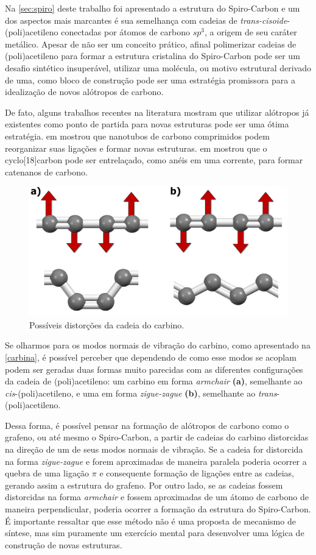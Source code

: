 	Na \autoref{sec:spiro} deste trabalho foi apresentado a estrutura do Spiro-Carbon e um dos aspectos mais marcantes é sua semelhança com cadeias de \textit{trans-cisoide}-(poli)acetileno conectadas por átomos de carbono $sp^3$, a origem de seu caráter metálico. Apesar de não ser um conceito prático, afinal polimerizar cadeias de (poli)acetileno para formar a estrutura cristalina do Spiro-Carbon pode ser um desafio sintético insuperável, utilizar uma molécula, ou motivo estrutural derivado de uma, como bloco de construção pode ser uma estratégia promissora para a idealização de novos alótropos de carbono.
	
	De fato, alguns trabalhos recentes na literatura mostram que utilizar alótropos já existentes como ponto de partida para novas estruturas pode ser uma ótima estratégia. \citeauthor{hu2013compressed} em \citeyear{hu2013compressed} mostrou que nanotubos de carbono comprimidos podem reorganizar suas ligações e formar novas estruturas. \citeauthor{fedik2020can} em \citeyear{fedik2020can} mostrou que o cyclo[18]carbon pode ser entrelaçado, como anéis em uma corrente, para formar catenanos de carbono. 
			
	\begin{figure}[!ht]
		\centering
		\includegraphics[width=.7\linewidth]{capitulos/fig/results3/carbina}
		\caption{Possíveis distorções da cadeia do carbino.}
		\label{carbina}
	\end{figure}

	Se olharmos para os modos normais de vibração do carbino, como apresentado na \autoref{carbina}, é possível perceber que dependendo de como esse modos se acoplam podem ser geradas duas formas muito parecidas com as diferentes configurações da cadeia de (poli)acetileno: um carbino em forma \textit{armchair} \textbf{(a)}, semelhante ao \textit{cis}-(poli)acetileno, e uma em forma \textit{zigue-zague} \textbf{(b)}, semelhante ao \textit{trans}-(poli)acetileno.
	
	Dessa forma, é possível pensar na formação de alótropos de carbono como o grafeno, ou até mesmo o Spiro-Carbon, a partir de cadeias do carbino distorcidas na direção de um de seus modos normais de vibração. Se a cadeia for distorcida na forma \textit{zigue-zague} e forem aproximadas de maneira paralela poderia ocorrer a quebra de uma ligação $\pi$ e consequente formação de ligações entre as cadeias, gerando assim a estrutura do grafeno. Por outro lado, se as cadeias fossem distorcidas na forma \textit{armchair} e fossem aproximadas de um átomo de carbono de maneira perpendicular, poderia ocorrer a formação da estrutura do Spiro-Carbon. É importante ressaltar que esse método não é uma proposta de mecanismo de síntese, mas sim puramente um exercício mental para desenvolver uma lógica de construção de novas estruturas. 
	
